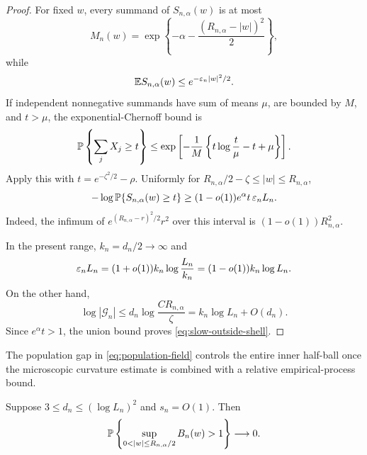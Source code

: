 \begin{proof}
For fixed \(w\), every summand of \(S_{n,\alpha}(w)\) is at most
\begin{equation}
\label{eq:slow-jump-simple}
 M_n(w)=\exp\left\{-\alpha
 -\frac{(R_{n,\alpha}-|w|)^2}{2}\right\},
\end{equation}
while
\begin{equation}
\label{eq:slow-mean-simple}
 \mathbb E S_{n,\alpha}(w)\le e^{-\varepsilon_n|w|^2/2}.
\end{equation}
If independent nonnegative summands have sum of means \(\mu\), are bounded
by \(M\), and \(t>\mu\), the exponential-Chernoff bound is
\begin{equation}
\label{eq:bounded-poisson-chernoff}
 \mathbb P\left\{\sum_jX_j\ge t\right\}
 \le
 \exp\left[-\frac1M
 \left\{t\log\frac t\mu-t+\mu\right\}\right].
\end{equation}
Apply this with \(t=e^{-\zeta^2/2}-\rho\).  Uniformly for
\(R_{n,\alpha}/2-\zeta\le|w|\le R_{n,\alpha}\),
\[
 -\log\mathbb P\{S_{n,\alpha}(w)\ge t\}
 \ge(1-o(1))e^\alpha t\,\varepsilon_nL_n.
\]
Indeed, the infimum of
\(e^{(R_{n,\alpha}-r)^2/2}r^2\) over this interval is
\((1-o(1))R_{n,\alpha}^2\).

In the present range, \(k_n=d_n/2\to\infty\) and
\begin{equation}
\label{eq:slow-entropy-match}
 \varepsilon_nL_n
 =(1+o(1))k_n\log\frac{L_n}{k_n}
 =(1-o(1))k_n\log L_n.
\end{equation}
On the other hand,
\[
 \log|\mathcal G_n|
 \le d_n\log\frac{CR_{n,\alpha}}\zeta
 =k_n\log L_n+O(d_n).
\]
Since \(e^\alpha t>1\), the union bound proves
\eqref{eq:slow-outside-shell}.
\end{proof}

The population gap in \eqref{eq:population-field} controls the entire inner
half-ball once the
microscopic curvature estimate is combined with a relative empirical-process
bound.
\begin{lemma}
\label{lem:slow-bulk}
Suppose \(3\le d_n\le(\log L_n)^2\) and \(s_n=O(1)\).  Then
\begin{equation}
\label{eq:slow-bulk}
 \Pbb\left\{
  \sup_{0<|w|\le R_{n,\alpha}/2}B_n(w)>1
 \right\}\longrightarrow0.
\end{equation}
\end{lemma}

